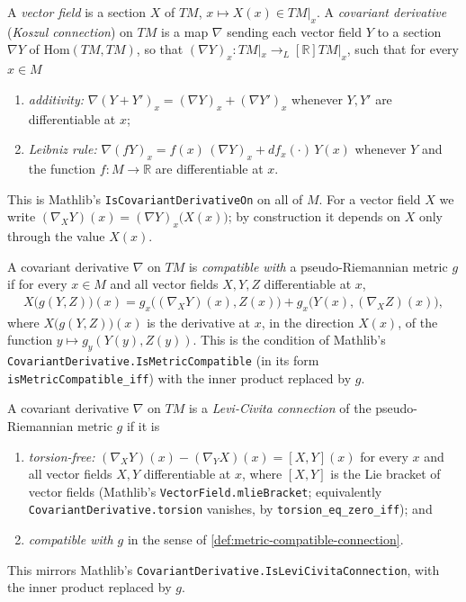 \begin{definition}
    \label{def:metric-compatible-connection}
    \leanok
    A \textit{vector field} is a section $X$ of $TM$, $x \mapsto X(x) \in TM|_x$. A \textit{covariant derivative} (\textit{Koszul connection}) on $TM$ is a map $\nabla$ sending each vector field $Y$ to a section $\nabla Y$ of $\mathrm{Hom}(TM, TM)$, so that $(\nabla Y)_x : TM|_x \to_L[\mathbb{R}] TM|_x$, such that for every $x \in M$
    \begin{enumerate}
        \item \emph{additivity:} $\nabla(Y + Y')_x = (\nabla Y)_x + (\nabla Y')_x$ whenever $Y, Y'$ are differentiable at $x$;
        \item \emph{Leibniz rule:} $\nabla(fY)_x = f(x)\,(\nabla Y)_x + df_x(\cdot)\, Y(x)$ whenever $Y$ and the function $f : M \to \mathbb{R}$ are differentiable at $x$.
    \end{enumerate}
    This is Mathlib's \texttt{IsCovariantDerivativeOn} on all of $M$. For a vector field $X$ we write $(\nabla_X Y)(x) = (\nabla Y)_x\big(X(x)\big)$; by construction it depends on $X$ only through the value $X(x)$.

    A covariant derivative $\nabla$ on $TM$ is \textit{compatible with} a pseudo-Riemannian metric $g$ if for every $x \in M$ and all vector fields $X, Y, Z$ differentiable at $x$,
    \begin{align}
        X\big(g(Y,Z)\big)(x) = g_x\big((\nabla_X Y)(x), Z(x)\big) + g_x\big(Y(x), (\nabla_X Z)(x)\big),
    \end{align}
    where $X\big(g(Y,Z)\big)(x)$ is the derivative at $x$, in the direction $X(x)$, of the function $y \mapsto g_y(Y(y), Z(y))$. This is the condition of Mathlib's \texttt{CovariantDerivative.IsMetricCompatible} (in its form \texttt{isMetricCompatible\_iff}) with the inner product replaced by $g$.
\end{definition}

\begin{definition}
    \label{def:levi-civita-connection}
    \leanok
    A covariant derivative $\nabla$ on $TM$ is a \textit{Levi-Civita connection} of the pseudo-Riemannian metric $g$ if it is
    \begin{enumerate}
        \item \emph{torsion-free:} $(\nabla_X Y)(x) - (\nabla_Y X)(x) = [X,Y](x)$ for every $x$ and all vector fields $X, Y$ differentiable at $x$, where $[X,Y]$ is the Lie bracket of vector fields (Mathlib's \texttt{VectorField.mlieBracket}; equivalently \texttt{CovariantDerivative.torsion} vanishes, by \texttt{torsion\_eq\_zero\_iff}); and
        \item \emph{compatible with $g$} in the sense of \ref{def:metric-compatible-connection}.
    \end{enumerate}
    This mirrors Mathlib's \texttt{CovariantDerivative.IsLeviCivitaConnection}, with the inner product replaced by $g$.
\end{definition}

